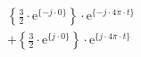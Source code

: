 \correct
\[
\begin{split}
&   \left \{ \frac{3}{2} \cdot \textrm{e}^{\{ -j \cdot 0 \}} \right \} \cdot \textrm{e}^{\{-j \cdot 4\pi \cdot t \}}\\
&+  \left \{ \frac{3}{2} \cdot \textrm{e}^{\{  j \cdot 0 \}} \right \} \cdot \textrm{e}^{\{ j \cdot 4\pi \cdot t \}}\\
\end{split}
\]
